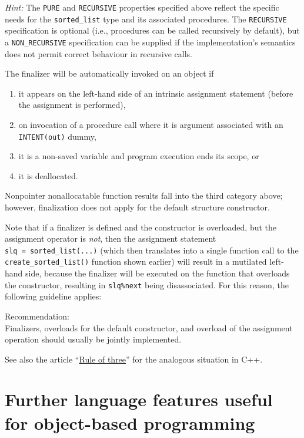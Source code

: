 \documentclass[
  paper=a4,
  ,captions=tableheading
]{scrartcl}
\providecommand{\tightlist}{%
  \setlength{\itemsep}{0pt}\setlength{\parskip}{0pt}}
\renewenvironment{quote}{\begin{customblockquote}\list{}{\rightmargin=0em\leftmargin=0em}%
\item\relax\color{blockquote-text}\ignorespaces}{\unskip\unskip\endlist\end{customblockquote}}
\begin{document}
\emph{Hint:} The \texttt{PURE} and \texttt{RECURSIVE} properties
specified above reflect the specific needs for the \texttt{sorted\_list}
type and its associated procedures. The \texttt{RECURSIVE} specification
is optional (i.e., procedures can be called recursively by default), but
a \texttt{NON\_RECURSIVE} specification can be supplied if the
implementation's semantics does not permit correct behaviour in
recursive calls.

The finalizer will be automatically invoked on an object if

\begin{enumerate}
\def\labelenumi{\arabic{enumi}.}
\tightlist
\item
  it appears on the left-hand side of an intrinsic assignment statement
  (before the assignment is performed),
\item
  on invocation of a procedure call where it is argument associated with
  an \texttt{INTENT(out)} dummy,
\item
  it is a non-saved variable and program execution ends its scope, or
\item
  it is deallocated.
\end{enumerate}

Nonpointer nonallocatable function results fall into the third category
above; however, finalization does not apply for the default structure
constructor.

Note that if a finalizer is defined and the constructor is overloaded,
but the assignment operator is \emph{not}, then the assignment statement
\texttt{slq\ =\ sorted\_list(...)} (which then translates into a single
function call to the \texttt{create\_sorted\_list()} function shown
earlier) will result in a mutilated left-hand side, because the
finalizer will be executed on the function that overloads the
constructor, resulting in \texttt{slq\%next} being disassociated. For
this reason, the following guideline applies:

\begin{quote}
Recommendation:\\
Finalizers, overloads for the default constructor, and overload of the
assignment operation should usually be jointly implemented.
\end{quote}

See also the article
``\href{https://en.wikipedia.org/wiki/Rule_of_three_(C\%2B\%2B_programming)}{Rule
of three}'' for the analogous situation in C++.

\section{Further language features useful for object-based
programming}\label{further-language-features-useful-for-object-based-programming}
\end{document}
